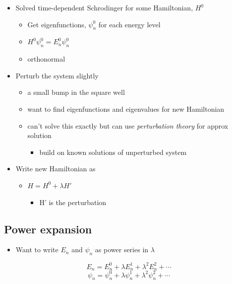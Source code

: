 \documentclass[a4paper,11pt,normalem]{article}
\begin{document}
\begin{itemize}

\item
  Solved time-dependent Schrodinger for some Hamiltonian, \(H^0\)
  \begin{itemize}
  \item
    Get eigenfunctions, \(\psi_{n}^0\) for each energy level
  \item
    \(H^0 \psi_{n}^0 = E_{n}^0 \psi_{n}^0\)
  \item
    orthonormal
  \end{itemize}
\item
  Perturb the system slightly
  \begin{itemize}
  \item
    a small bump in the square well
  \item
    want to find eigenfunctions and eigenvalues for new Hamiltonian
  \item
    can't solve this exactly but can use \emph{perturbation theory} for
    approx solution
    \begin{itemize}
    \item
      build on known solutions of unperturbed system
    \end{itemize}
  \end{itemize}
\item
  Write new Hamiltonian as
  \begin{itemize}
  \item
    \(H = H^0 + \lambda H'\)
    \begin{itemize}
    \item
      H' is the perturbation
    \end{itemize}
  \end{itemize}
\end{itemize}

\subsection{Power expansion}\label{power-expansion}

\begin{itemize}
\item
  Want to write \(E_n\) and \(\psi_n\) as power series in \(\lambda\)
\end{itemize}

\[
    E_n = E_{n}^0 + \lambda E_{n}^1 + \lambda^2 E_{n}^2 + \cdots \] \[
    \psi_n = \psi_{n}^0 + \lambda \psi_{n}^1 + \lambda^2 \psi_{n}^2 + \cdots
\]
\end{document}
